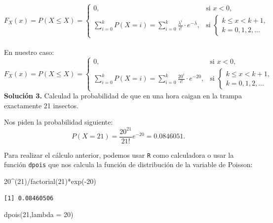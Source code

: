 \documentclass[
  letterpaper,
  DIV=11,
  numbers=noendperiod]{scrreprt}
\newenvironment{Shaded}{\begin{snugshade}}{\end{snugshade}}
\newcommand{\AttributeTok}[1]{\textcolor[rgb]{0.40,0.45,0.13}{#1}}
\newcommand{\DecValTok}[1]{\textcolor[rgb]{0.68,0.00,0.00}{#1}}
\newcommand{\FunctionTok}[1]{\textcolor[rgb]{0.28,0.35,0.67}{#1}}
\newcommand{\NormalTok}[1]{\textcolor[rgb]{0.00,0.23,0.31}{#1}}
\newcommand{\SpecialCharTok}[1]{\textcolor[rgb]{0.37,0.37,0.37}{#1}}
\begin{document}
\[
F_X(x)=P(X\leq X)=
\left\{\begin{array}{ll} 
0, & \mbox{si } x<0,\\
\displaystyle\sum_{i=0}^{k} P(X=i)=\sum_{i=0}^{k}\frac{\lambda^i}{i!}\cdot e^{-\lambda}, & \mbox{si  }
\left\{\begin{array}{l}
k\leq x< k+1,\\k=0,1,2,\ldots
\end{array}
\right.
\end{array}
\right.
\]\\
En nuestro caso: \[
F_X(x)=P(X\leq X)=
\left\{\begin{array}{ll} 
0, & \mbox{si } x<0,\\
\displaystyle\sum_{i=0}^{k} P(X=i)=\sum_{i=0}^{k}\frac{20^i}{i!}\cdot e^{-20}, & \mbox{si  }
\left\{\begin{array}{l}
k\leq x< k+1,\\k=0,1,2,\ldots
\end{array}
\right.
\end{array}
\right.
\] \textbf{Solución 3.} Calculad la probabilidad de que en una hora
caigan en la trampa exactamente 21 insectos.

Nos piden la probabilidad siguiente: \[
P(X=21)=\frac{20^{21}}{21!} e^{-20}=0.0846051.
\]

Para realizar el cálculo anterior, podemos usar \texttt{R} como
calculadora o usar la función \texttt{dpois} que nos calcula la función
de distribución de la variable de Poisson:

\begin{Shaded}
\begin{Highlighting}[]
\DecValTok{20}\SpecialCharTok{\^{}}\NormalTok{(}\DecValTok{21}\NormalTok{)}\SpecialCharTok{/}\FunctionTok{factorial}\NormalTok{(}\DecValTok{21}\NormalTok{)}\SpecialCharTok{*}\FunctionTok{exp}\NormalTok{(}\SpecialCharTok{{-}}\DecValTok{20}\NormalTok{)}
\end{Highlighting}
\end{Shaded}

\begin{verbatim}
[1] 0.08460506
\end{verbatim}

\begin{Shaded}
\begin{Highlighting}[]
\FunctionTok{dpois}\NormalTok{(}\DecValTok{21}\NormalTok{,}\AttributeTok{lambda =} \DecValTok{20}\NormalTok{)}
\end{Highlighting}
\end{Shaded}
\end{document}
